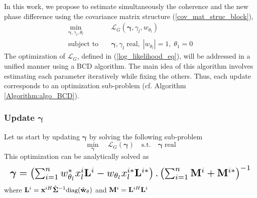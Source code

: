 In this work, we propose to estimate simultaneously the coherence and the new phase difference using the covariance matrix structure (\ref{cov_mat_struc_block}), 
\vspace{-10pt} 
\begin{equation}
\begin{aligned}
\min_{\boldsymbol{\gamma}, \gamma_{l}, \theta_{l}} \quad & \mathcal{L}_G(\boldsymbol{\gamma}, \gamma_{l}, w_{\theta_{l}}) \\
\text{subject to} \quad & \boldsymbol{\gamma}, \gamma_{l} \; \text{real}, \; |w_{\theta_{l}}| = 1 , \; \theta_1 = 0
\end{aligned}
\end{equation}
The optimization of $\mathcal{L}_G$, defined in (\ref{log_likelihood_eq}), will be addressed in a unified manner using a \acs{BCD} algorithm. The main idea of this algorithm involves estimating each parameter iteratively  while fixing the others. Thus, each update corresponds to an optimization sub-problem (cf. Algorithm \ref{Algorithm:algo_BCD}). 
\vspace{-10pt} 
\subsubsection*{Update $\boldsymbol{\gamma}$}
Let us start by updating $\boldsymbol{\gamma}$ by solving the following sub-problem %
\begin{equation}
\label{Equation:problem2}
\min_{\boldsymbol{\gamma}} \quad  \mathcal{L}_G(\boldsymbol{\gamma}) \quad 
\text{s.t.} \quad  \boldsymbol{\gamma} \; \text{real}
\end{equation}
This optimization can be analytically solved as %
\begin{equation}
\label{Equation:gamma_vector}
\resizebox{\columnwidth}{!}{$
\small \boldsymbol{\gamma} = \small \left(\sum_{i=1}^n w_{\theta_{l}}^* x_{l}^i \mathbf{L}^i - w_{\theta_{l}} x_{l}^{i*} \mathbf{L}^{i*}  \right) . \left(\sum_{i=1}^n \mathbf{M}^i + \mathbf{M}^{i*} \right)^{-1}
$}
\end{equation}
where $\small \mathbf{L}^i = \small \mathbf{x}^{iH} \hat{\mathbf{\Sigma}}^{-1} \text{diag}(\hat{\mathbf{w}}_{\theta})$ and $\small \mathbf{M}^i = \small \mathbf{L}^{iH} \mathbf{L}^i$
\vspace{-10pt} 

